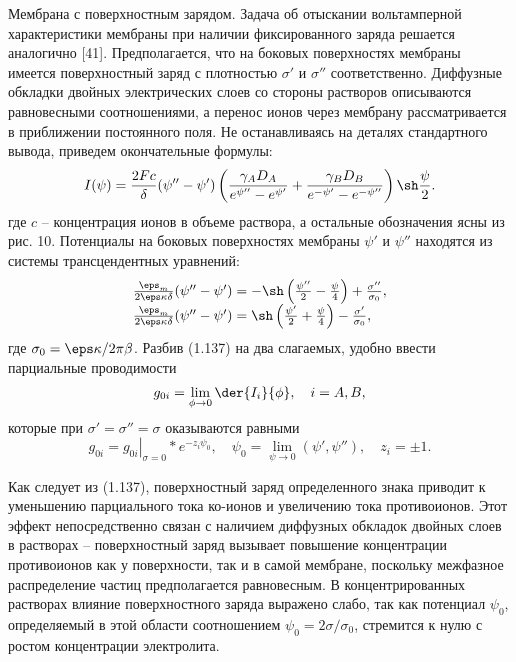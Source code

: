 Мембрана с поверхностным зарядом. Задача об отыскании вольтамперной
характеристики мембраны при наличии фиксированного заряда решается аналогично
[41]. Предполагается, что на боковых поверхностях мембраны имеется поверхностный
заряд с плотностью \( \sigma' \) и \( \sigma'' \) соответственно. Диффузные
обкладки двойных электрических слоев со стороны растворов описываются
равновесными соотношениями, а перенос ионов через мембрану рассматривается в
приближении постоянного поля. Не останавливаясь на деталях стандартного вывода,
приведем окончательные формулы:
\begin{equation}
    I(\psi) = \frac{2Fc}{\delta}(\psi'' - \psi')
    \left(\frac{\gamma_A D_A}{e^{\psi''} - e^{\psi'}} +
    \frac{\gamma_B D_B}{e^{-\psi'} - e^{-\psi''}}\right)\sh\frac{\psi}{2}.
\end{equation}
где \( c \) -- концентрация ионов в объеме раствора, а остальные обозначения
ясны из рис. 10. Потенциалы на боковых поверхностях
мембраны \( \psi' \) и \( \psi'' \) находятся из системы трансцендентных
уравнений:
\begin{equation}
    \begin{array}{l}
    \frac{\eps_m}{2\eps\kappa\delta}(\psi'' - \psi') =
        -\sh\left(\frac{\psi''}{2} - \frac{\psi}{4}\right) +
        \frac{\sigma''}{\sigma_0},\\
    \frac{\eps_m}{2\eps\kappa\delta}(\psi'' - \psi') =
        \sh\left(\frac{\psi'}{2} + \frac{\psi}{4}\right) -
        \frac{\sigma'}{\sigma_0},\\
    \end{array}
\end{equation}
где \( \sigma_0 = \eps\kappa/2\pi\beta \). Разбив (1.137) на два слагаемых,
удобно ввести парциальные проводимости
\[
    g_{0i} = \lim_{\phi\to0}\der{I_i}{\phi},\quad i=A,B,
\]
которые при \( \sigma' = \sigma'' = \sigma \) оказываются равными
\begin{equation}
    g_{0i} = \left.g_{0i}\right|_{\sigma=0}*e^{-z_i\psi_0},\quad
    \psi_0 = \lim_{\psi\to0}(\psi', \psi''),\quad z_i = \pm 1.
\end{equation}

Как следует из (1.137), поверхностный заряд определенного знака приводит к
уменьшению парциального тока ко-ионов и увеличению тока противоионов. Этот
эффект непосредственно связан с наличием диффузных обкладок двойных слоев в
растворах -- поверхностный заряд вызывает повышение концентрации противоионов
как у поверхности, так и в самой мембране, поскольку межфазное распределение
частиц предполагается равновесным. В концентрированных растворах влияние
поверхностного заряда
выражено слабо, так как потенциал \( \psi_0 \), определяемый в этой области
соотношением \( \psi_0 = 2\sigma/\sigma_0 \), стремится к нулю с ростом
концентрации электролита.

